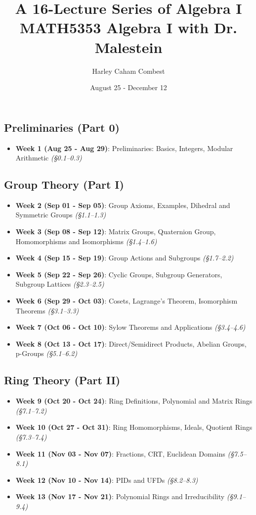 \documentclass{article}
\title{
    \textbf{A 16-Lecture Series of Algebra I}\\
    \large MATH5353 Algebra I with Dr. Malestein\\
    }
\author{Harley Caham Combest}
\date{August 25 - December 12}
\begin{document}
\maketitle

\subsection*{Preliminaries (Part 0)}
\begin{itemize}
    \item \textbf{Week 1 (Aug 25 - Aug 29)}: Preliminaries: Basics, Integers, Modular Arithmetic \textit{(§0.1–0.3)}
\end{itemize}

\subsection*{Group Theory (Part I)}
\begin{itemize}
    \item \textbf{Week 2 (Sep 01 - Sep 05)}: Group Axioms, Examples, Dihedral and Symmetric Groups \textit{(§1.1–1.3)}
    \item \textbf{Week 3 (Sep 08 - Sep 12)}: Matrix Groups, Quaternion Group, Homomorphisms and Isomorphisms \textit{(§1.4–1.6)}
    \item \textbf{Week 4 (Sep 15 - Sep 19)}: Group Actions and Subgroups \textit{(§1.7–2.2)}
    \item \textbf{Week 5 (Sep 22 - Sep 26)}: Cyclic Groups, Subgroup Generators, Subgroup Lattices \textit{(§2.3–2.5)}
    \item \textbf{Week 6 (Sep 29 - Oct 03)}: Cosets, Lagrange's Theorem, Isomorphism Theorems \textit{(§3.1–3.3)}
    \item \textbf{Week 7 (Oct 06 - Oct 10)}: Sylow Theorems and Applications \textit{(§3.4–4.6)}
    \item \textbf{Week 8 (Oct 13 - Oct 17)}: Direct/Semidirect Products, Abelian Groups, p-Groups \textit{(§5.1–6.2)}
\end{itemize}

\subsection*{Ring Theory (Part II)}
\begin{itemize}
    \item \textbf{Week 9 (Oct 20 - Oct 24)}: Ring Definitions, Polynomial and Matrix Rings \textit{(§7.1–7.2)}
    \item \textbf{Week 10 (Oct 27 - Oct 31)}: Ring Homomorphisms, Ideals, Quotient Rings \textit{(§7.3–7.4)}
    \item \textbf{Week 11 (Nov 03 - Nov 07)}: Fractions, CRT, Euclidean Domains \textit{(§7.5–8.1)}
    \item \textbf{Week 12 (Nov 10 - Nov 14)}: PIDs and UFDs \textit{(§8.2–8.3)}
    \item \textbf{Week 13 (Nov 17 - Nov 21)}: Polynomial Rings and Irreducibility \textit{(§9.1–9.4)}
\end{itemize}
\end{document}
